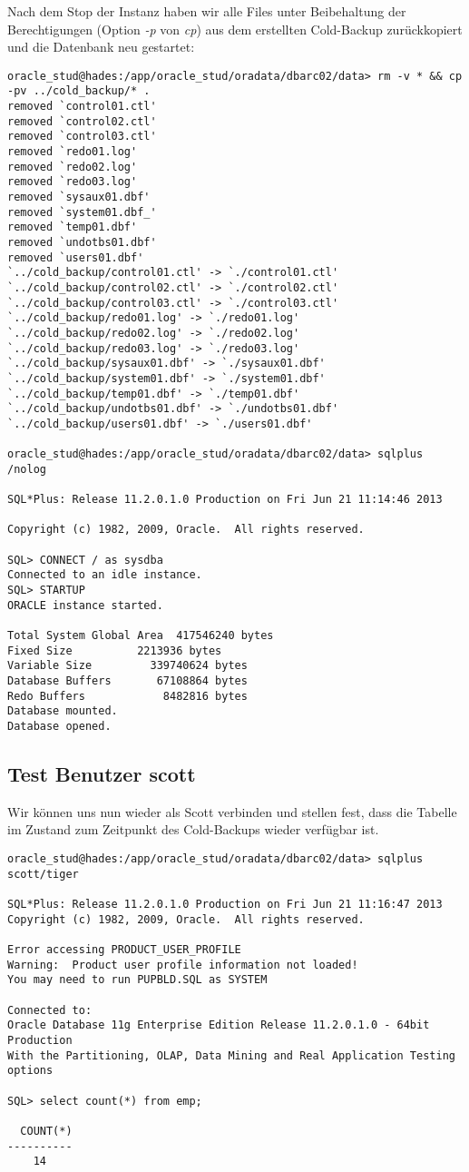 \documentclass[11pt,a4paper,parskip=half]{scrartcl}
\begin{document}
Nach dem Stop der Instanz haben wir alle Files unter Beibehaltung der Berechtigungen (Option \emph{-p} von \emph{cp}) aus dem erstellten Cold-Backup zurückkopiert und die Datenbank neu gestartet:
\begin{lstlisting}
oracle_stud@hades:/app/oracle_stud/oradata/dbarc02/data> rm -v * && cp -pv ../cold_backup/* .
removed `control01.ctl'
removed `control02.ctl'
removed `control03.ctl'
removed `redo01.log'
removed `redo02.log'
removed `redo03.log'
removed `sysaux01.dbf'
removed `system01.dbf_'
removed `temp01.dbf'
removed `undotbs01.dbf'
removed `users01.dbf'
`../cold_backup/control01.ctl' -> `./control01.ctl'
`../cold_backup/control02.ctl' -> `./control02.ctl'
`../cold_backup/control03.ctl' -> `./control03.ctl'
`../cold_backup/redo01.log' -> `./redo01.log'
`../cold_backup/redo02.log' -> `./redo02.log'
`../cold_backup/redo03.log' -> `./redo03.log'
`../cold_backup/sysaux01.dbf' -> `./sysaux01.dbf'
`../cold_backup/system01.dbf' -> `./system01.dbf'
`../cold_backup/temp01.dbf' -> `./temp01.dbf'
`../cold_backup/undotbs01.dbf' -> `./undotbs01.dbf'
`../cold_backup/users01.dbf' -> `./users01.dbf'

oracle_stud@hades:/app/oracle_stud/oradata/dbarc02/data> sqlplus /nolog

SQL*Plus: Release 11.2.0.1.0 Production on Fri Jun 21 11:14:46 2013

Copyright (c) 1982, 2009, Oracle.  All rights reserved.

SQL> CONNECT / as sysdba
Connected to an idle instance.
SQL> STARTUP
ORACLE instance started.

Total System Global Area  417546240 bytes
Fixed Size		    2213936 bytes
Variable Size		  339740624 bytes
Database Buffers	   67108864 bytes
Redo Buffers		    8482816 bytes
Database mounted.
Database opened.
\end{lstlisting}

\subsection{Test Benutzer scott}
Wir können uns nun wieder als Scott verbinden und stellen fest, dass die Tabelle im Zustand zum Zeitpunkt des Cold-Backups wieder verfügbar ist.
\begin{lstlisting}
oracle_stud@hades:/app/oracle_stud/oradata/dbarc02/data> sqlplus scott/tiger

SQL*Plus: Release 11.2.0.1.0 Production on Fri Jun 21 11:16:47 2013
Copyright (c) 1982, 2009, Oracle.  All rights reserved.

Error accessing PRODUCT_USER_PROFILE
Warning:  Product user profile information not loaded!
You may need to run PUPBLD.SQL as SYSTEM

Connected to:
Oracle Database 11g Enterprise Edition Release 11.2.0.1.0 - 64bit Production
With the Partitioning, OLAP, Data Mining and Real Application Testing options

SQL> select count(*) from emp;

  COUNT(*)
----------
	14
\end{lstlisting}
\end{document}
